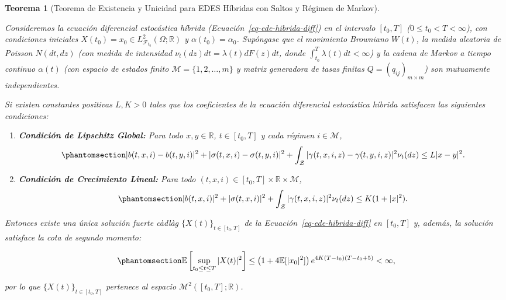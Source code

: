 \documentclass[
  spanish,
  letterpaper,
  DIV=11,
  numbers=noendperiod]{scrreprt}
\theoremstyle{plain}
\theoremstyle{plain}
\newtheorem{theorem}{Teorema}[chapter]
\theoremstyle{plain}
\theoremstyle{definition}
\theoremstyle{remark}
\begin{document}
\begin{theorem}[Teorema de Existencia y Unicidad para EDES Híbridas con
Saltos y Régimen de
Markov]\protect\hypertarget{thm-mao-switching}{}\label{thm-mao-switching}

Consideremos la ecuación diferencial estocástica híbrida
(Ecuación~\ref{eq-ede-hibrida-diff}) en el intervalo \([t_0, T]\)
(\(0 \le t_0 < T < \infty\)), con condiciones iniciales
\(X(t_0) = x_0 \in L^2_{\mathcal{F}_{t_0}}(\Omega; \mathbb{R})\) y
\(\alpha(t_0) = \alpha_0\). Supóngase que el movimiento Browniano
\(W(t)\), la medida aleatoria de Poisson \(N(dt, dz)\) (con medida de
intensidad \(\nu_t(dz)dt = \lambda(t)dF(z)dt\), donde
\(\displaystyle \int_{t_0}^T \lambda(t)dt < \infty\)) y la cadena de
Markov a tiempo continuo \(\alpha(t)\) (con espacio de estados finito
\(\mathcal{M} = \{1, 2, \dots, m\}\) y matriz generadora de tasas
finitas \(Q = (q_{ij})_{m \times m}\)) son mutuamente independientes.

Si existen constantes positivas \(L, K > 0\) tales que los coeficientes
de la ecuación diferencial estocástica híbrida satisfacen las siguientes
condiciones:

\begin{enumerate}
\def\labelenumi{\arabic{enumi}.}
\item
  \textbf{Condición de Lipschitz Global:} Para todo
  \(x, y \in \mathbb{R}\), \(t \in [t_0, T]\) y cada régimen
  \(i \in \mathcal{M}\),
  \begin{equation}\phantomsection\label{eq-hip-lipschitz-hibrida}{
  \vert b(t, x, i) - b(t, y, i) \vert^2 + \vert \sigma(t, x, i) - \sigma(t, y, i) \vert^2 + \int_{\mathcal{Z}} \vert \gamma(t, x, i, z) - \gamma(t, y, i, z) \vert^2 \nu_t(dz) \le L \vert x - y \vert^2.
  }\end{equation}
\item
  \textbf{Condición de Crecimiento Lineal:} Para todo
  \((t, x, i) \in [t_0, T] \times \mathbb{R} \times \mathcal{M}\),
  \begin{equation}\phantomsection\label{eq-hip-crecimiento-hibrida}{
  \vert b(t, x, i) \vert^2 + \vert \sigma(t, x, i) \vert^2 + \int_{\mathcal{Z}} \vert \gamma(t, x, i, z) \vert^2 \nu_t(dz) \le K (1 + \vert x \vert^2).
  }\end{equation}
\end{enumerate}

Entonces existe una única solución fuerte càdlàg
\(\{X(t)\}_{t \in [t_0, T]}\) de la Ecuación~\ref{eq-ede-hibrida-diff}
en \([t_0, T]\) y, además, la solución satisface la cota de segundo
momento:

\begin{equation}\phantomsection\label{eq-cota-supremo-hibrida}{
\mathbb{E}\left[ \sup_{t_0 \le t \le T} \vert X(t) \vert^2 \right] \le \left( 1 + 4\mathbb{E}[\vert x_0 \vert^2] \right) e^{4K(T - t_0)(T - t_0 + 5)} < \infty,
}\end{equation}

por lo que \(\{X(t)\}_{t \in [t_0, T]}\) pertenece al espacio
\(\mathcal{M}^2([t_0, T]; \mathbb{R})\).

\end{theorem}
\end{document}
